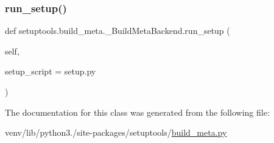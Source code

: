 \mbox{\label{classsetuptools_1_1build__meta_1_1__BuildMetaBackend_a53ec68b77c60e1208e2413bde8361d9f}} 
\subsubsection{\texorpdfstring{run\+\_\+setup()}{run\_setup()}}
{\footnotesize\ttfamily def setuptools.\+build\+\_\+meta.\+\_\+\+Build\+Meta\+Backend.\+run\+\_\+setup (\begin{DoxyParamCaption}\item[{}]{self,  }\item[{}]{setup\+\_\+script = {\ttfamily \textquotesingle{}setup.py\textquotesingle{}} }\end{DoxyParamCaption})}



The documentation for this class was generated from the following file\+:\begin{DoxyCompactItemize}
\item 
venv/lib/python3./site-\/packages/setuptools/\hyperlink{build__meta_8py}{build\+\_\+meta.\+py}\end{DoxyCompactItemize}
